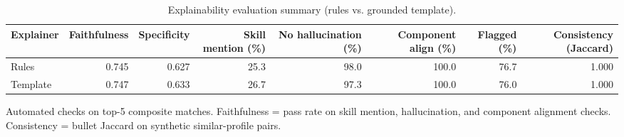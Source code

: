 \begin{table}[htbp]
\centering
\caption{Explainability evaluation summary (rules vs. grounded template).}
\label{tab:explanation-quality}
\begin{tabular}{lrrrrrrr}
\toprule
Explainer & Faithfulness & Specificity & Skill mention (\%) & No hallucination (\%) & Component align (\%) & Flagged (\%) & Consistency (Jaccard) \\
\midrule
Rules & 0.745 & 0.627 & 25.3 & 98.0 & 100.0 & 76.7 & 1.000 \\
Template & 0.747 & 0.633 & 26.7 & 97.3 & 100.0 & 76.0 & 1.000 \\
\bottomrule
\end{tabular}
\footnotesize{Automated checks on top-5 composite matches. Faithfulness = pass rate on skill mention, hallucination, and component alignment checks. Consistency = bullet Jaccard on synthetic similar-profile pairs.}
\end{table}
